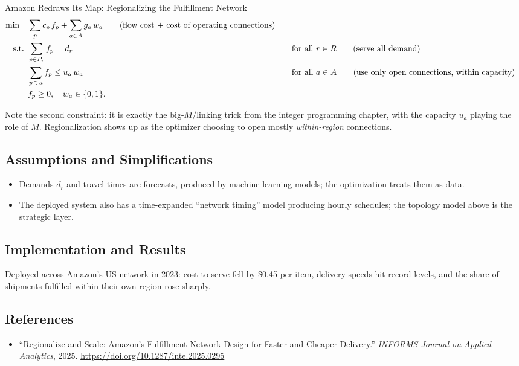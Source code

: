 \begin{casestudybox}{Amazon Redraws Its Map: Regionalizing the Fulfillment Network}
\begin{align*}
\min \quad & \sum_{p} c_p\, f_p + \sum_{a \in A} g_a\, w_a   \tag{flow cost + cost of operating connections} \\
\text{ s.t. }        & \sum_{p \in P_r} f_p = d_r &&\quad \text{for all } r \in R   \tag{serve all demand} \\
           & \sum_{p \,\ni\, a} f_p \leq u_a\, w_a &&\quad \text{for all } a \in A   \tag{use only open connections, within capacity} \\
           & f_p \geq 0, \quad w_a \in \{0,1\}.
\end{align*}

Note the second constraint: it is exactly the big-$M$/linking trick from the integer programming chapter, with the capacity $u_a$ playing the role of $M$.  Regionalization shows up as the optimizer choosing to open mostly \emph{within-region} connections.

\subsection*{Assumptions and Simplifications}
\begin{itemize}
\item Demands $d_r$ and travel times are forecasts, produced by machine learning models; the optimization treats them as data.
\item The deployed system also has a time-expanded ``network timing'' model producing hourly schedules; the topology model above is the strategic layer.
\end{itemize}

\subsection*{Implementation and Results}
Deployed across Amazon's US network in 2023: cost to serve fell by \$0.45 per item, delivery speeds hit record levels, and the share of shipments fulfilled within their own region rose sharply.

\subsection*{References}
\begin{itemize}
\item ``Regionalize and Scale: Amazon's Fulfillment Network Design for Faster and Cheaper Delivery.'' \emph{INFORMS Journal on Applied Analytics}, 2025. \url{https://doi.org/10.1287/inte.2025.0295}
\end{itemize}
\end{casestudybox}

